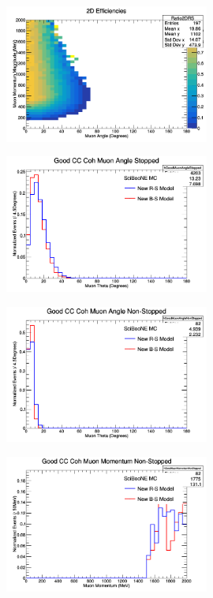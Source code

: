 \documentclass[11pt]{article}
\begin{document}
\begin{figure}[H]
\centering
\includegraphics[width=0.6\textwidth]{ANMCombinedPlotsImages/6-ANMCombinedPlots.png}
\caption{}
\end{figure}

\begin{figure}[H]
\centering
\includegraphics[width=0.6\textwidth]{ANMCombinedPlotsImages/7-ANMCombinedPlots.png}
\caption{}
\end{figure}

\begin{figure}[H]
\centering
\includegraphics[width=0.6\textwidth]{ANMCombinedPlotsImages/8-ANMCombinedPlots.png}
\caption{}
\end{figure}

\begin{figure}[H]
\centering
\includegraphics[width=0.6\textwidth]{ANMCombinedPlotsImages/9-ANMCombinedPlots.png}
\caption{}
\end{figure}
\end{document}
